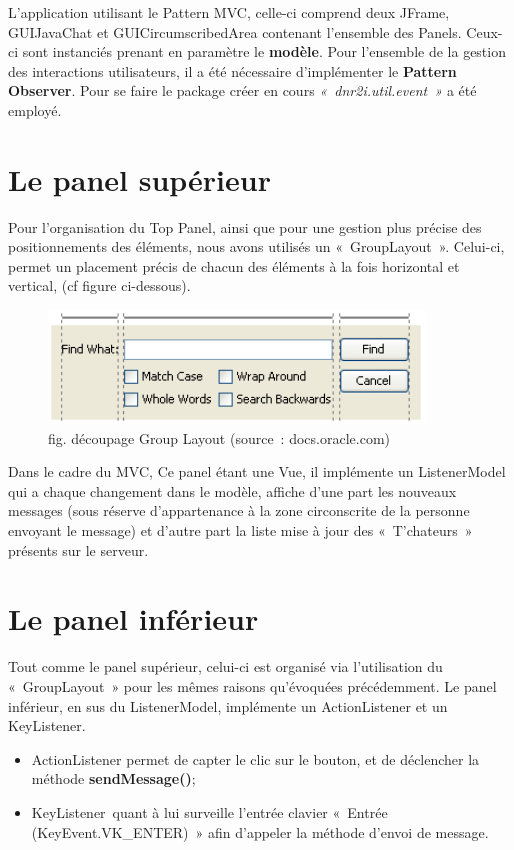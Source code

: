 \documentclass[a4paper,12pt]{report}
\begin{document}
    L’application utilisant le Pattern MVC, celle-ci comprend deux JFrame, GUIJavaChat et GUICircumscribedArea contenant l’ensemble des Panels. Ceux-ci sont instanciés prenant en paramètre le \textbf{modèle}.
    \medbreak
    Pour l’ensemble de la gestion des interactions utilisateurs, il a été nécessaire d’implémenter le \textbf{Pattern Observer}. Pour se faire le package créer en cours \emph{« dnr2i.util.event »} a été employé.

    \section{Le panel supérieur}
    Pour l’organisation du Top Panel, ainsi que pour une gestion plus précise des positionnements des éléments, nous avons utilisés un « GroupLayout ». Celui-ci, permet un placement précis de chacun des éléments à la fois horizontal et vertical, (cf figure ci-dessous).
    \medbreak
    \begin{figure}[!ht]%
      \centering 
      \includegraphics[width=10cm]{deecoupageGroupLayout.jpg}
      \caption{fig. découpage Group Layout (source : docs.oracle.com) }
    \end{figure}
    \bigbreak
    Dans le cadre du MVC, Ce panel étant une Vue, il implémente un ListenerModel qui a chaque changement dans le modèle, affiche d’une part les nouveaux messages (sous réserve d'appartenance à la zone circonscrite de la personne envoyant le message) et d’autre part la liste mise à jour des « T’chateurs » présents sur le serveur.

    \section{Le panel inférieur}
    Tout comme le panel supérieur, celui-ci est organisé via l’utilisation du « GroupLayout » pour les mêmes raisons qu’évoquées précédemment.
    \medbreak
    Le panel inférieur, en sus du ListenerModel, implémente un ActionListener et un KeyListener.
    \medbreak
    \begin{itemize}
      \item ActionListener permet de capter le clic sur le bouton, et de déclencher la méthode \textbf{sendMessage()};
      \item KeyListener quant à lui surveille l’entrée clavier « Entrée (KeyEvent.VK\_ENTER) » afin d’appeler la méthode d’envoi de message.
    \end{itemize}
    \bigbreak
\end{document}
